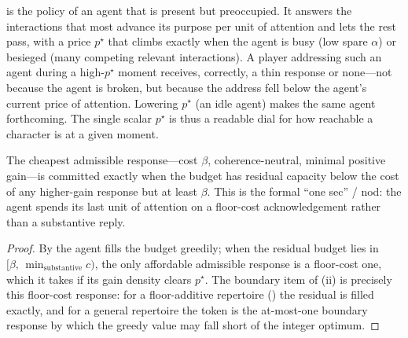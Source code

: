 \documentclass[11pt,twocolumn,a4paper]{article}
\newcommand{\floorc}{\beta}          %
\newcommand{\att}{\alpha}            %
\newcommand{\cost}{c}                %
\begin{document}
\begin{remark}
\label{rem:preoccupied}
 is the policy of an agent that is present but
preoccupied. It answers the interactions that most advance its purpose per
unit of attention and lets the rest pass, with a price $p^\star$ that
climbs exactly when the agent is busy (low spare $\att$) or besieged (many
competing relevant interactions). A player addressing such an agent during
a high-$p^\star$ moment receives, correctly, a thin response or none---not
because the agent is broken, but because the address fell below the
agent's current price of attention. Lowering $p^\star$ (an idle agent)
makes the same agent forthcoming. The single scalar $p^\star$ is thus a
readable dial for how reachable a character is at a given moment.
\end{remark}

\begin{corollary}
\label{cor:token}
The cheapest admissible response---cost $\floorc$, coherence-neutral,
minimal positive gain---is committed exactly when the budget has residual
capacity below the cost of any higher-gain response but at least $\floorc$.
This is the formal ``one sec'' / nod: the agent spends its last unit of
attention on a floor-cost acknowledgement rather than a substantive reply.
\end{corollary}

\begin{proof}
By  the agent fills the budget greedily; when the
residual budget lies in $[\floorc,\,\min_{\text{substantive}}\cost)$, the
only affordable admissible response is a floor-cost one, which it takes if
its gain density clears $p^\star$. The boundary item of
(ii) is precisely this floor-cost response: for a
floor-additive repertoire () the residual is filled
exactly, and for a general repertoire the token is the at-most-one boundary
response by which the greedy value may fall short of the integer optimum.
\end{proof}
\end{document}
